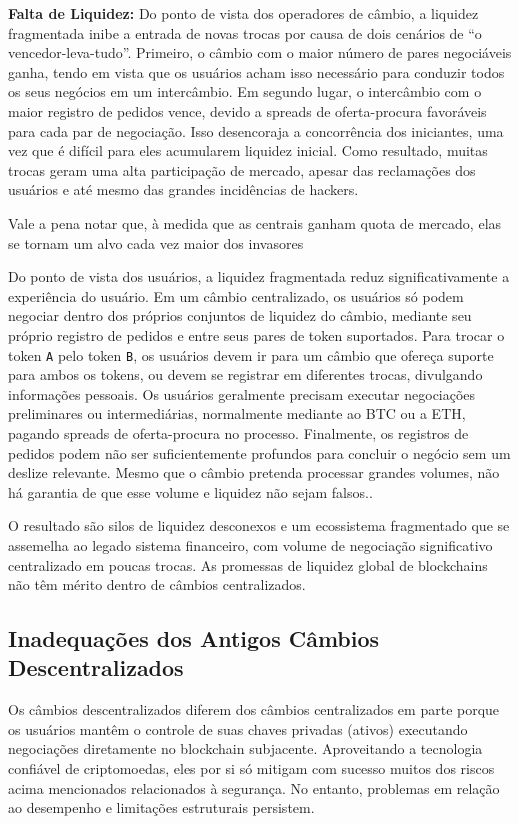 \documentclass[UTF8,nofonts]{article}
\begin{document}
\begin{multicols}{2}
\textbf{Falta de Liquidez:} Do ponto de vista dos operadores de câmbio, a liquidez fragmentada inibe a entrada de novas trocas por causa de dois cenários de “o vencedor-leva-tudo”. Primeiro, o câmbio com o maior número de pares negociáveis ganha, tendo em vista que os usuários acham isso necessário para conduzir todos os seus negócios em um intercâmbio. Em segundo lugar, o intercâmbio com o maior registro de pedidos vence, devido a spreads de oferta-procura favoráveis para cada par de negociação. Isso desencoraja a concorrência dos iniciantes, uma vez que é difícil para eles acumularem liquidez inicial.
Como resultado, muitas trocas geram uma alta participação de mercado, apesar das reclamações dos usuários e até mesmo das grandes incidências de hackers.

Vale a pena notar que, à medida que as centrais ganham quota de mercado, elas se tornam um alvo cada vez maior dos invasores


Do ponto de vista dos usuários, a liquidez fragmentada reduz significativamente a experiência do usuário. Em um câmbio centralizado, os usuários só podem negociar dentro dos próprios conjuntos de liquidez do câmbio, mediante seu próprio registro de pedidos e entre seus pares de token suportados. Para trocar o token \verb|A| pelo token \verb|B|,  os usuários devem ir para um câmbio que ofereça suporte para ambos os tokens, ou devem se registrar em diferentes trocas, divulgando informações pessoais. Os usuários geralmente precisam executar negociações preliminares ou intermediárias, normalmente mediante ao BTC ou a ETH, pagando spreads de oferta-procura no processo. Finalmente, os registros de pedidos podem não ser suficientemente profundos para concluir o negócio sem um deslize relevante. Mesmo que o câmbio pretenda processar grandes volumes, não há garantia de que esse volume e liquidez não sejam falsos.\cite{fakevolume}.


O resultado são silos de liquidez desconexos e um ecossistema fragmentado que se assemelha ao legado sistema financeiro, com volume de negociação significativo centralizado em poucas trocas. As promessas de liquidez global de blockchains não têm mérito dentro de câmbios centralizados.

\subsection{Inadequações dos Antigos Câmbios Descentralizados}
Os câmbios descentralizados diferem dos câmbios centralizados em parte porque os usuários mantêm o controle de suas chaves privadas (ativos) executando negociações diretamente no blockchain subjacente. Aproveitando a tecnologia confiável de criptomoedas, eles por si só mitigam com sucesso muitos dos riscos acima mencionados relacionados à segurança. No entanto, problemas em relação ao desempenho e limitações estruturais persistem.


\end{multicols}
\end{document}
